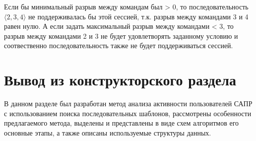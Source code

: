 Если бы минимальный разрыв между командам был > 0, то последовательность $\langle2,3,4\rangle$ не поддерживалась бы этой сессией, т.к. разрыв между командами 3 и 4 равен нулю. А если задать максимальный разрыв между командами < 3, то разрыв между командами 2 и 3 не  будет удовлетворять заданному условию и соотвественно последовательность также не будет поддерживаться сессией.

\section*{Вывод из конструкторского раздела}
В данном разделе был разработан метод анализа активности пользователей САПР с использованием поиска последовательных шаблонов, рассмотрены особенности предлагаемого метода, выделены и представлены в виде схем алгоритмов его основные этапы, а также описаны используемые структуры данных.